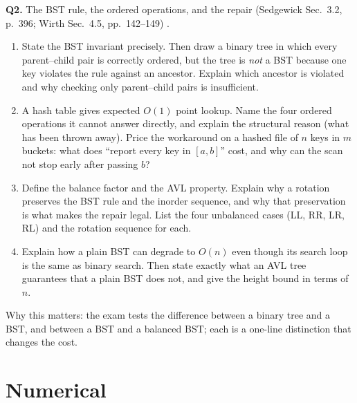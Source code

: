 \documentclass[11pt]{article}
\begin{document}
\textbf{Q2.} The BST rule, the ordered operations, and the repair (Sedgewick Sec.~3.2, p.~396; Wirth Sec.~4.5, pp.~142--149) \cite{Sedgewick2011_algorithms,Wirth2004_algorithms_data_structures}.
\begin{enumerate}
  \item[(a)] State the BST invariant precisely. Then draw a binary tree in which every parent--child pair is correctly ordered, but the tree is \emph{not} a BST because one key violates the rule against an ancestor. Explain which ancestor is violated and why checking only parent--child pairs is insufficient.
  \item[(b)] A hash table gives expected $O(1)$ point lookup. Name the four ordered operations it cannot answer directly, and explain the structural reason (what has been thrown away). Price the workaround on a hashed file of $n$ keys in $m$ buckets: what does ``report every key in $[a,b]$'' cost, and why can the scan not stop early after passing $b$?
  \item[(c)] Define the balance factor and the AVL property. Explain why a rotation preserves the BST rule and the inorder sequence, and why that preservation is what makes the repair legal. List the four unbalanced cases (LL, RR, LR, RL) and the rotation sequence for each.
  \item[(d)] Explain how a plain BST can degrade to $O(n)$ even though its search loop is the same as binary search. Then state exactly what an AVL tree guarantees that a plain BST does not, and give the height bound in terms of $n$.
\end{enumerate}
Why this matters: the exam tests the difference between a binary tree and a BST, and between a BST and a balanced BST; each is a one-line distinction that changes the cost.

\section{Numerical}
\end{document}
